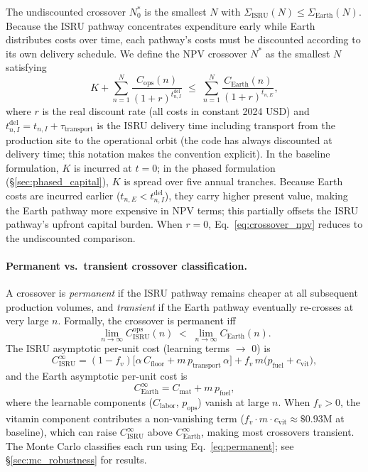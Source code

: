 \documentclass[preprint,12pt]{elsarticle}
\begin{document}
The undiscounted crossover $N^*_0$ is the smallest $N$ with $\Sigma_{\mathrm{ISRU}}(N) \leq \Sigma_{\mathrm{Earth}}(N)$. Because the ISRU pathway concentrates expenditure early while Earth distributes costs over time, each pathway's costs must be discounted according to its own delivery schedule. We define the NPV crossover $N^*$ as the smallest $N$ satisfying
\begin{equation}
  K + \sum_{n=1}^{N} \frac{C_{\mathrm{ops}}(n)}{(1+r)^{t_{n,I}^{\mathrm{del}}}} \;\leq\; \sum_{n=1}^{N} \frac{C_{\mathrm{Earth}}(n)}{(1+r)^{t_{n,E}}},
  \label{eq:crossover_npv}
\end{equation}
where $r$ is the real discount rate (all costs in constant 2024 USD) and $t_{n,I}^{\mathrm{del}} = t_{n,I} + \tau_{\mathrm{transport}}$ is the ISRU delivery time including transport from the production site to the operational orbit (the code has always discounted at delivery time; this notation makes the convention explicit). In the baseline formulation, $K$ is incurred at $t = 0$; in the phased formulation (\S\ref{sec:phased_capital}), $K$ is spread over five annual tranches. Because Earth costs are incurred earlier ($t_{n,E} < t_{n,I}^{\mathrm{del}}$), they carry higher present value, making the Earth pathway more expensive in NPV terms; this partially offsets the ISRU pathway's upfront capital burden. When $r = 0$, Eq.~\ref{eq:crossover_npv} reduces to the undiscounted comparison.

\paragraph{Permanent vs.\ transient crossover classification.} A crossover is \emph{permanent} if the ISRU pathway remains cheaper at all subsequent production volumes, and \emph{transient} if the Earth pathway eventually re-crosses at very large $n$. Formally, the crossover is permanent iff
\begin{equation}
  \lim_{n \to \infty} C_{\mathrm{ISRU}}^{\mathrm{ops}}(n) \;<\; \lim_{n \to \infty} C_{\mathrm{Earth}}(n).
  \label{eq:permanent}
\end{equation}
The ISRU asymptotic per-unit cost (learning terms $\to$ 0) is
\[
  C_{\mathrm{ISRU}}^{\infty} = (1 - f_v)\bigl[\alpha \, C_{\mathrm{floor}} + m \, p_{\mathrm{transport}} \, \alpha\bigr] + f_v \, m \bigl(p_{\mathrm{fuel}} + c_{\mathrm{vit}}\bigr),
\]
and the Earth asymptotic per-unit cost is
\[
  C_{\mathrm{Earth}}^{\infty} = C_{\mathrm{mat}} + m \, p_{\mathrm{fuel}},
\]
where the learnable components ($C_{\mathrm{labor}}$, $p_{\mathrm{ops}}$) vanish at large $n$. When $f_v > 0$, the vitamin component contributes a non-vanishing term ($f_v \cdot m \cdot c_{\mathrm{vit}} \approx \$0.93$M at baseline), which can raise $C_{\mathrm{ISRU}}^{\infty}$ above $C_{\mathrm{Earth}}^{\infty}$, making most crossovers transient. The Monte Carlo classifies each run using Eq.~\ref{eq:permanent}; see \S\ref{sec:mc_robustness} for results.
\end{document}
